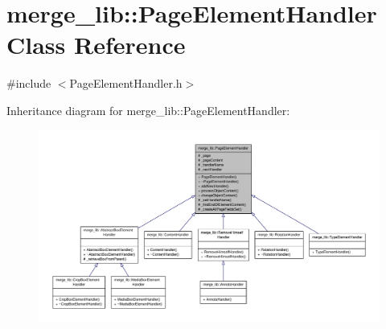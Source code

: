 \hypertarget{classmerge__lib_1_1_page_element_handler}{\section{merge\-\_\-lib\-:\-:Page\-Element\-Handler Class Reference}
\label{da/d91/classmerge__lib_1_1_page_element_handler}
}


{\ttfamily \#include $<$Page\-Element\-Handler.\-h$>$}



Inheritance diagram for merge\-\_\-lib\-:\-:Page\-Element\-Handler\-:
\nopagebreak
\begin{figure}[H]
\begin{center}
\leavevmode
\includegraphics[width=350pt]{d7/d8f/classmerge__lib_1_1_page_element_handler__inherit__graph}
\end{center}
\end{figure}


